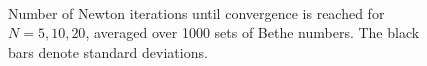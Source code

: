 \documentclass[11pt, a4paper]{report} %
\begin{document}
\begin{figure}[H]
  \centering
  \\
  \\
  \\
  \caption{Number of Newton iterations until convergence is reached for \(N=5,10,20\), averaged over 1000 sets of Bethe numbers. The black bars denote standard deviations.}
  \label{fig:iterations}
\end{figure}
\end{document}
